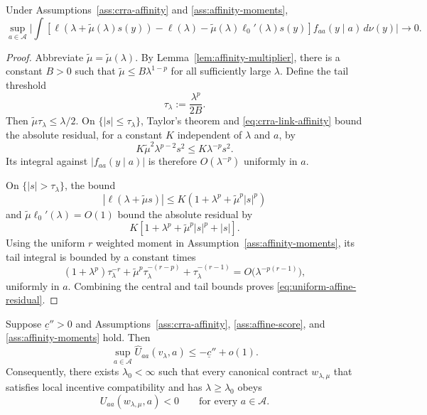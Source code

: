 \documentclass[12pt]{article}
\begin{document}
\begin{lemma}
\label{lem:uniform-affine-residual}
Under Assumptions~\ref{ass:crra-affinity} and
\ref{ass:affinity-moments},
\begin{equation}
 \sup_{a\in\mathcal A}\Bigg|\int
 \left[\ell(\lambda+\widetilde\mu(\lambda)s(y))-\ell(\lambda)
 -\widetilde\mu(\lambda)\ell_0'(\lambda)s(y)\right]
 f_{aa}(y\mid a)\,d\nu(y)\Bigg|\longrightarrow0.
 \label{eq:uniform-affine-residual}
\end{equation}
\end{lemma}

\begin{proof}
Abbreviate $\widetilde\mu=\widetilde\mu(\lambda)$.  By
Lemma~\ref{lem:affinity-multiplier}, there is a constant $B>0$ such that
$\widetilde\mu\leq B\lambda^{1-p}$ for all sufficiently large $\lambda$.
Define the tail threshold
\[
    \tau_\lambda:=\frac{\lambda^p}{2B}.
\]
Then $\widetilde\mu\tau_\lambda\leq\lambda/2$.
On $\{|s|\leq\tau_\lambda\}$, Taylor's theorem and
\eqref{eq:crra-link-affinity} bound the absolute residual, for a constant $K$
independent of $\lambda$ and $a$, by
\[
    K\widetilde\mu^2\lambda^{p-2}s^2
    \leq K\lambda^{-p}s^2.
\]
Its integral against $|f_{aa}(y\mid a)|$ is therefore $O(\lambda^{-p})$
uniformly in $a$.

On $\{|s|>\tau_\lambda\}$, the bound
\[
    |\ell(\lambda+\widetilde\mu s)|
    \leq K(1+\lambda^p+\widetilde\mu^p|s|^p)
\]
and $\widetilde\mu\ell_0'(\lambda)=O(1)$ bound the absolute residual by
\[
    K\left[1+\lambda^p+\widetilde\mu^p|s|^p+|s|\right].
\]
Using the uniform $r$ weighted moment in Assumption~\ref{ass:affinity-moments}, its tail integral is bounded by a constant times
\[
 (1+\lambda^p)\tau_\lambda^{-r}
 +\widetilde\mu^p\tau_\lambda^{-(r-p)}
 +\tau_\lambda^{-(r-1)}
 =O\bigl(\lambda^{-p(r-1)}\bigr),
\]
uniformly in $a$.  Combining the central and tail bounds proves
\eqref{eq:uniform-affine-residual}.
\end{proof}

\begin{proposition}
\label{prop:asymptotic-affinity}
Suppose $\underline c''>0$ and Assumptions~\ref{ass:crra-affinity},
\ref{ass:affine-score}, and \ref{ass:affinity-moments} hold.  Then
\[
    \sup_{a\in\mathcal A}
    \widehat U_{aa}(v_\lambda,a)
    \leq-\underline c''+o(1).
\]
Consequently, there exists $\lambda_0<\infty$ such that every canonical
contract $w_{\lambda,\mu}$ that satisfies local incentive compatibility and
has $\lambda\geq\lambda_0$ obeys
\[
    U_{aa}(w_{\lambda,\mu},a)<0
    \qquad\text{for every }a\in\mathcal A.
\]
\end{proposition}
\end{document}
